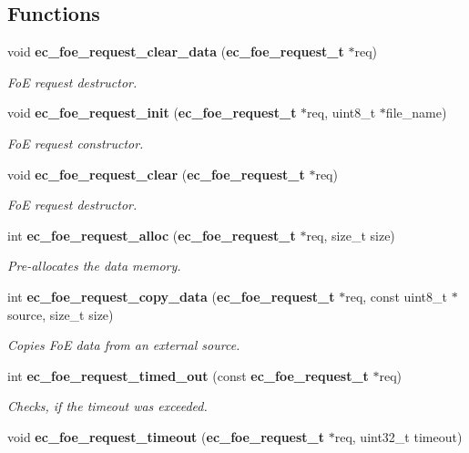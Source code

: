 \subsection*{\-Functions}
\begin{DoxyCompactItemize}
\item 
void {\bf ec\-\_\-foe\-\_\-request\-\_\-clear\-\_\-data} ({\bf ec\-\_\-foe\-\_\-request\-\_\-t} $\ast$req)
\begin{DoxyCompactList}\small\item\em \-Fo\-E request destructor. \end{DoxyCompactList}\item 
void {\bf ec\-\_\-foe\-\_\-request\-\_\-init} ({\bf ec\-\_\-foe\-\_\-request\-\_\-t} $\ast$req, uint8\-\_\-t $\ast$file\-\_\-name)
\begin{DoxyCompactList}\small\item\em \-Fo\-E request constructor. \end{DoxyCompactList}\item 
void {\bf ec\-\_\-foe\-\_\-request\-\_\-clear} ({\bf ec\-\_\-foe\-\_\-request\-\_\-t} $\ast$req)
\begin{DoxyCompactList}\small\item\em \-Fo\-E request destructor. \end{DoxyCompactList}\item 
int {\bf ec\-\_\-foe\-\_\-request\-\_\-alloc} ({\bf ec\-\_\-foe\-\_\-request\-\_\-t} $\ast$req, size\-\_\-t size)
\begin{DoxyCompactList}\small\item\em \-Pre-\/allocates the data memory. \end{DoxyCompactList}\item 
int {\bf ec\-\_\-foe\-\_\-request\-\_\-copy\-\_\-data} ({\bf ec\-\_\-foe\-\_\-request\-\_\-t} $\ast$req, const uint8\-\_\-t $\ast$source, size\-\_\-t size)
\begin{DoxyCompactList}\small\item\em \-Copies \-Fo\-E data from an external source. \end{DoxyCompactList}\item 
int {\bf ec\-\_\-foe\-\_\-request\-\_\-timed\-\_\-out} (const {\bf ec\-\_\-foe\-\_\-request\-\_\-t} $\ast$req)
\begin{DoxyCompactList}\small\item\em \-Checks, if the timeout was exceeded. \end{DoxyCompactList}\item 
void {\bf ec\-\_\-foe\-\_\-request\-\_\-timeout} ({\bf ec\-\_\-foe\-\_\-request\-\_\-t} $\ast$req, uint32\-\_\-t timeout)

\end{DoxyCompactItemize}
